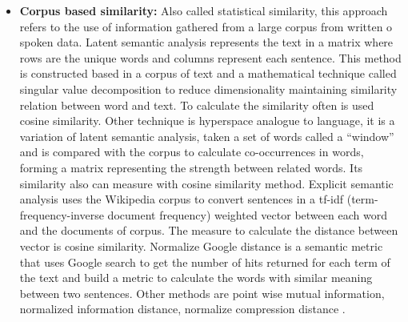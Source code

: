\documentclass[12pt]{report}
\begin{document}
\begin{itemize}[nolistsep]
	\item \textbf{Corpus based similarity:} 
	Also called statistical similarity, this approach refers to the use  of information gathered from a large corpus from written o spoken data. Latent semantic analysis represents the text in a matrix where rows are the unique words and columns represent each sentence. This method is constructed based in a corpus of text and a mathematical technique called singular value decomposition to reduce dimensionality maintaining similarity relation between word and text. To calculate the similarity often is used cosine similarity.  Other technique is hyperspace analogue to language, it is a variation of latent semantic analysis, taken a set of words called a ``window'' and is compared with the corpus to calculate co-occurrences in words, forming a matrix representing the strength between related words. Its similarity also can measure with cosine similarity method. Explicit semantic analysis uses the Wikipedia corpus to convert sentences in a tf-idf (term-frequency-inverse document frequency) weighted vector between each word and the documents of corpus. The measure to calculate the distance between vector is cosine similarity. Normalize Google distance is a semantic metric that uses Google search to get the number of hits returned for each term of the text and build a metric to calculate the words with similar meaning between two sentences. Other methods are point wise mutual information, normalized information distance, normalize compression distance  \cite{Ganesan2015} \cite{ Zhang2015} \cite{Gomaa2013} \cite{Majumder2016}.
	

\end{itemize}
\end{document}
